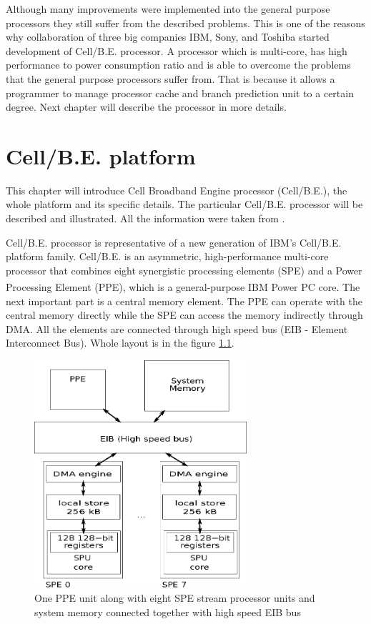 \par
Although many improvements were implemented into the general purpose processors they still suffer from the described problems.
This is one of the reasons why collaboration of three big companies IBM, Sony, and Toshiba started development of Cell/B.E. processor.
A processor which is multi-core, has high performance to power consumption ratio and is able to overcome the problems that the general purpose processors suffer from.
That is because it allows a programmer to manage processor cache and branch prediction unit to a certain degree.
Next chapter will describe the processor in more details.

\chapter{Cell/B.E. platform}

This chapter will introduce Cell Broadband Engine processor (Cell/B.E.), the whole platform and its specific details.
The particular Cell/B.E. processor will be described and illustrated.
All the information were taken from \cite{cbeCenter}.

\par
Cell/B.E. processor is representative of a new generation of IBM's Cell/B.E. platform family.
Cell/B.E. is an asymmetric, high-performance multi-core processor that combines eight synergistic processing elements (SPE) and a Power Processing Element (PPE), which is a general-purpose IBM Power PC\textsuperscript{\textregistered} core.
The next important part is a central memory element.
The PPE can operate with the central memory directly while the SPE can access the memory indirectly through DMA.
All the elements are connected through high speed bus (EIB - Element Interconnect Bus).
Whole layout is in the figure \ref{fg:processorLayout}.

\begin{figure}
    \centering
    \includegraphics[width=0.7\textwidth]{data/cellLayout}
    \caption[Cell/B.E. processor layout]{One PPE unit along with eight SPE stream processor units and system memory connected together with high speed EIB bus}
    \label{fg:processorLayout}
\end{figure}

